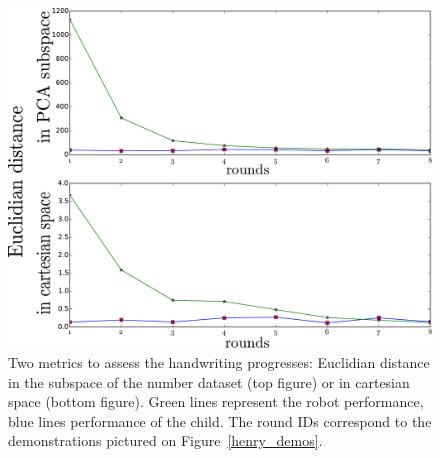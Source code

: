 \documentclass{sig-alternate}
\begin{document}
\begin{figure}
    \centering
    \includegraphics[width=0.9\linewidth]{learning_6_distances}
    \caption{\small Two metrics to assess the handwriting progresses: Euclidian
    distance in the subspace of the number dataset (top figure) or in
cartesian space (bottom figure). Green lines represent the robot performance,
blue lines performance of the child. The round IDs correspond to the demonstrations
pictured on Figure~\ref{henry_demos}.}
    \label{henry_distances}
\end{figure}

\end{document}
